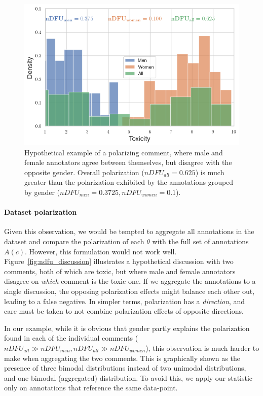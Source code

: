 \documentclass{article}
\begin{document}
\begin{figure}
	\centering
	\includegraphics[width=0.8\linewidth]{ndfu_combined.png}
	\caption{Hypothetical example of a polarizing comment, where male and female annotators agree between themselves, but disagree with the opposite gender. Overall polarization ($nDFU_{all} = 0.625$) is much greater than the polarization exhibited by the annotations grouped by gender ($nDFU_{men} = 0.3725, nDFU_{women} = 0.1$).}
	\label{fig:ndfu_combined}
\end{figure}

\paragraph{Dataset polarization} Given this observation, we would be tempted to aggregate all annotations in the dataset and compare the polarization of each $\theta$ with the full set of annotations $A(c)$. However, this formulation would not work well. Figure~\ref{fig:ndfu_discussion} illustrates a hypothetical discussion with two comments, both of which are toxic, but where male and female annotators disagree on \emph{which} comment is the toxic one. If we aggregate the annotations to a single discussion, the opposing polarization effects might balance each other out, leading to a false negative. In simpler terms, polarization has a \textit{direction}, and care must be taken to not combine polarization effects of opposite directions.

In our example, while it is obvious that gender partly explains the polarization found in each of the individual comments ($nDFU_{all} \gg nDFU_{men}, nDFU_{all} \gg nDFU_{women}$), this observation is much harder to make when aggregating the two comments. This is graphically shown as the presence of three bimodal distributions instead of two unimodal distributions, and one bimodal (aggregated) distribution. To avoid this, we apply our statistic only on annotations that reference the same data-point.
\end{document}
